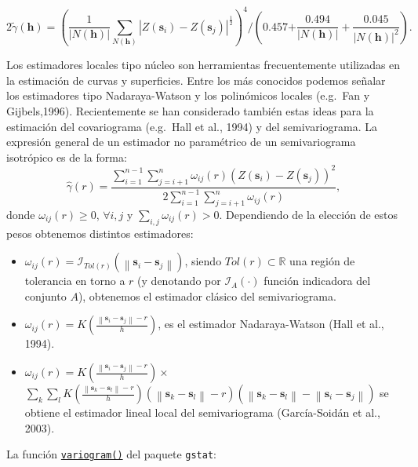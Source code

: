 \documentclass[
  spanish,
]{book}
\providecommand{\tightlist}{%
  \setlength{\itemsep}{0pt}\setlength{\parskip}{0pt}}
\theoremstyle{break}
\theoremstyle{definition}
\theoremstyle{definition}
\theoremstyle{definition}
\theoremstyle{definition}
\theoremstyle{remark}
\begin{document}
\[2\tilde{\gamma}(\mathbf{h}) = \left( \dfrac{1}{\left| N(\mathbf{h})\right| }
\sum\limits_{N(\mathbf{h})}\left| Z(\mathbf{s}_{i})-Z(\mathbf{s}_{j}
)\right|^{\frac{1}{2} } \right)^{4} /\left( \text{0.457+}
\dfrac{\text{0.494} }{\left| N(\mathbf{h})\right| } +\dfrac{\text{0.045}
}{\left| N(\mathbf{h})\right|^2 } \right).\]

Los estimadores locales tipo núcleo son herramientas frecuentemente utilizadas en la estimación de curvas y superficies.
Entre los más conocidos podemos señalar los estimadores tipo Nadaraya-Watson y los polinómicos locales (e.g.~Fan y Gijbels,1996).
Recientemente se han considerado también estas ideas para la estimación del covariograma (e.g.~Hall et al., 1994) y del semivariograma.
La expresión general de un estimador no paramétrico de un semivariograma isotrópico es de la forma:
\[\hat{\gamma}(r) = \dfrac{\sum\limits_{i=1}^{n-1}\sum\limits_{j=i+1}^{n}\omega_{ij}
(r)\left( Z(\mathbf{s}_{i})-Z(\mathbf{s}_{j})\right)^2  
}{2\sum\limits_{i=1}^{n-1}\sum\limits_{j=i+1}^{n}\omega_{ij}(r)},\]
donde \(\omega_{ij}(r) \geq 0\), \(\forall i,j\) y \(\sum_{i,j}\omega_{ij}(r) > 0\).
Dependiendo de la elección de estos pesos obtenemos distintos estimadores:

\begin{itemize}
\tightlist
\item
  \(\omega_{ij}(r) = \mathcal{I}_{Tol(r)} \left( \left\| \mathbf{s}_{i} - \mathbf{s}_{j} \right\| \right)\), siendo \(Tol(r)\subset \mathbb{R}\) una región de tolerancia en torno a \(r\) (y denotando por \(\mathcal{I}_{A}(\cdot)\) función indicadora del conjunto \(A\)), obtenemos el estimador clásico del semivariograma.
\item
  \(\omega_{ij}(r)=K\left( \frac{\left\| \mathbf{s}_{i} -\mathbf{s}_{j} \right\| -r}{h} \right)\), es el estimador Nadaraya-Watson (Hall et al., 1994).
\item
  \(\omega_{ij}(r)=K\left( \frac{\left\| \mathbf{s}_{i} -\mathbf{s}_{j} \right\| -r}{h} \right) \times\) \(\sum\limits_{k}\sum\limits_{l}K\left( \frac{\left\| \mathbf{s}_{k} -\mathbf{s}_{l} \right\| -r}{h} \right) \left( \left\| \mathbf{s}_{k} -\mathbf{s}_{l} \right\| -r\right) \left( \left\| \mathbf{s}_{k} -\mathbf{s}_{l} \right\| -\left\| \mathbf{s}_{i} -\mathbf{s}_{j} \right\| \right)\) se obtiene el estimador lineal local del semivariograma (García-Soidán et al., 2003).
\end{itemize}

La función \href{https://r-spatial.github.io/gstat/reference/variogram.html}{\texttt{variogram()}} del paquete \texttt{gstat}:
\end{document}
